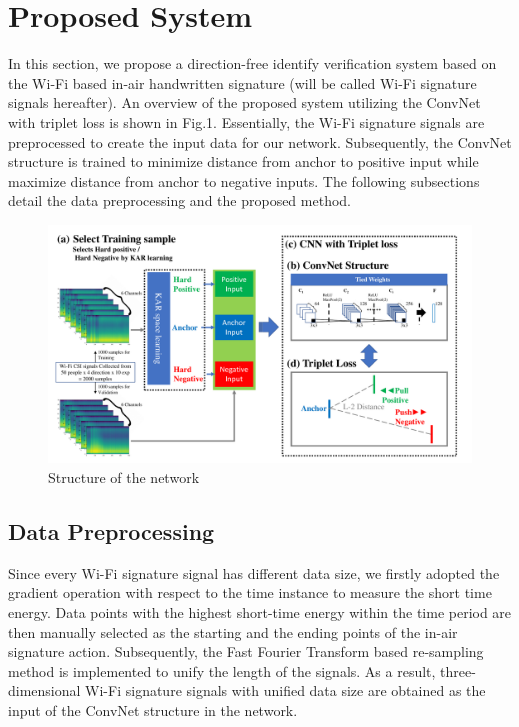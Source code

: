 \documentclass[runningheads]{llncs}
\begin{document}
\section{Proposed System}

In this section, we propose a direction-free identify verification system based on the Wi-Fi based in-air handwritten signature (will be called Wi-Fi signature signals hereafter). An overview of the proposed system utilizing the ConvNet with triplet loss is shown in Fig.1.
Essentially, the Wi-Fi signature signals are preprocessed to create the input data for our network. Subsequently, the ConvNet structure is trained to minimize distance from anchor to positive input while maximize distance from anchor to negative inputs. The following subsections detail the data preprocessing and the proposed method.

\begin{figure}
    \includegraphics[width=\textwidth]{fig1_network_structure.pdf}
    \caption{Structure of the network} \label{fig1}
\end{figure}

\subsection{Data Preprocessing}

Since every Wi-Fi signature signal has different data size, we firstly adopted the gradient operation with respect to the time instance to measure the short time energy. Data points with the highest short-time energy within the time period are then manually selected as the starting and the ending points of the in-air signature action. Subsequently, the Fast Fourier Transform based re-sampling method \cite{moon2017air} is implemented to unify the length of the signals. As a result, three-dimensional Wi-Fi signature signals with unified data size are obtained as the input of the ConvNet structure in the network.
\end{document}
